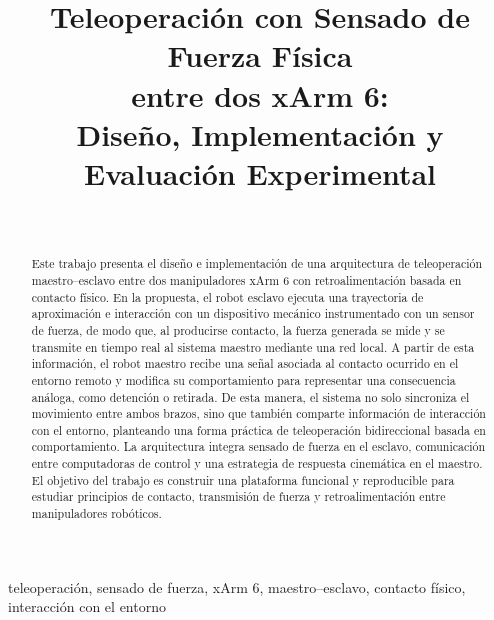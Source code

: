 \documentclass[journal,10pt,twoside]{IEEEtran}
\begin{document}
\title{Teleoperación con Sensado de Fuerza Física\\
  entre dos xArm 6:\\
  Diseño, Implementación y Evaluación Experimental}

\author{%
  \\
}

\maketitle

\begin{abstract}
Este trabajo presenta el diseño e implementación de una arquitectura de teleoperación maestro--esclavo entre dos 
manipuladores xArm 6 con retroalimentación basada en contacto físico. En la propuesta, el robot esclavo ejecuta 
una trayectoria de aproximación e interacción con un dispositivo mecánico instrumentado con un sensor de fuerza, 
de modo que, al producirse contacto, la fuerza generada se mide y se transmite en tiempo real al sistema maestro 
mediante una red local. A partir de esta información, el robot maestro recibe una señal asociada al contacto 
ocurrido en el entorno remoto y modifica su comportamiento para representar una consecuencia análoga, como 
detención o retirada. De esta manera, el sistema no solo sincroniza el movimiento entre ambos brazos, sino que 
también comparte información de interacción con el entorno, planteando una forma práctica de teleoperación bidireccional
basada en comportamiento. La arquitectura integra sensado de fuerza en el esclavo, comunicación entre computadoras de 
control y una estrategia de respuesta cinemática en el maestro. El objetivo del trabajo es construir una plataforma 
funcional y reproducible para estudiar principios de contacto, transmisión de fuerza y retroalimentación entre 
manipuladores robóticos.
\end{abstract}

\begin{IEEEkeywords}
teleoperación, sensado de fuerza, xArm 6, maestro--esclavo, contacto físico, interacción con el entorno
\end{IEEEkeywords}
\end{document}
